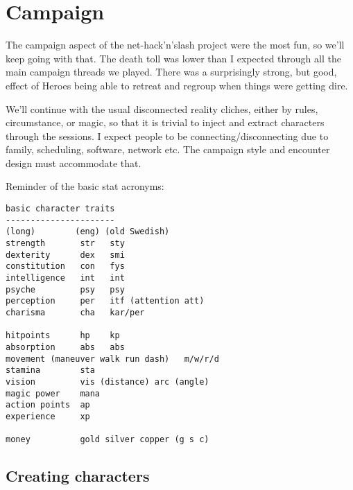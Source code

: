


\chapter*{Campaign}


The campaign aspect of the net-hack'n'slash project were the most fun, so we'll keep going with that. The death toll was lower than I expected through all the main campaign threads we played. There was a surprisingly strong, but good, effect of Heroes being able to retreat and regroup when things were getting dire.

We'll continue with the usual disconnected reality cliches, either by rules, circumstance, or magic, so that it is trivial to inject and extract characters through the sessions. I expect people to be connecting/disconnecting due to family, scheduling, software, network etc. The campaign style and encounter design must accommodate that.

Reminder of the basic stat acronyms:
\goodbreak \begin{samepage} \begin{verbatim}
basic character traits
----------------------
(long)        (eng) (old Swedish)
strength       str   sty
dexterity      dex   smi
constitution   con   fys
intelligence   int   int
psyche         psy   psy
perception     per   itf (attention att)
charisma       cha   kar/per

hitpoints      hp    kp
absorption     abs   abs
movement (maneuver walk run dash)   m/w/r/d
stamina        sta
vision         vis (distance) arc (angle)
magic power    mana
action points  ap
experience     xp

money          gold silver copper (g s c)
\end{verbatim} \end{samepage}






\section*{Creating characters}

